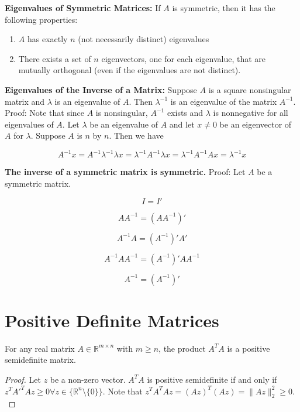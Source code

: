 \textbf{Eigenvalues of Symmetric Matrices:} If \(A\) is symmetric, then it has the following properties:

\begin{enumerate}[1.]

\item \(A\) has exactly \(n\) (not necessarily distinct) eigenvalues

\item There exists a set of \(n\) eigenvectors, one for each eigenvalue, that are mutually orthogonal (even if the eigenvalues are not distinct).

\end{enumerate}

\textbf{Eigenvalues of the Inverse of a Matrix:} Suppose \(A\) is a square nonsingular matrix and \(\lambda\) is an eigenvalue of \(A\). Then \(\lambda^{-1}\) is an eigenvalue of the matrix \(A^{-1}\). Proof: Note that since \(A\) is nonsingular, \(A^{-1}\) exists and \(\lambda\) is nonnegative for all eigenvalues of \(A\). Let \(\lambda\) be an eigenvalue of \(A\) and let \(x \neq 0\) be an eigenvector of \(A\) for \(\lambda\). Suppose \(A\) is \(n\) by \(n\). Then we have

\[
A^{-1}x = A^{-1}\lambda^{-1} \lambda x = \lambda^{-1} A^{-1} \lambda x = \lambda^{-1} A^{-1} A x = \lambda^{-1}x
\]

\textbf{The inverse of a symmetric matrix is symmetric.} Proof: Let \(A\) be a symmetric matrix.

\[
I = I'
\]

\[
A A^{-1} = (A A^{-1})'
\]

\[
A^{-1} A = (A^{-1})'A'
\]

\[
A^{-1} A A^{-1} = (A^{-1})'A A^{-1}
\]

\[
A^{-1} = (A^{-1})'
\]

\section{Positive Definite Matrices}

\begin{proposition}\label{linalg.prop.inner.prod.psd}
For any real matrix \(A \in \mathbb{R}^{m \times n}\) with \(m \geq n\), the product \(A^T A\) is a positive semidefinite matrix. 

\end{proposition}

\begin{proof}
Let \(z\) be a non-zero vector. \(A^TA\) is positive semidefinite if and only if \(z^T A'^TA z \geq 0 \forall z \in \{ \mathbb{R}^n \setminus \{0\}\}\). Note that \(z^T A^T A z = (Az)^T(Az) = \lVert Az \rVert_2^2 \geq 0.\)

\end{proof}

